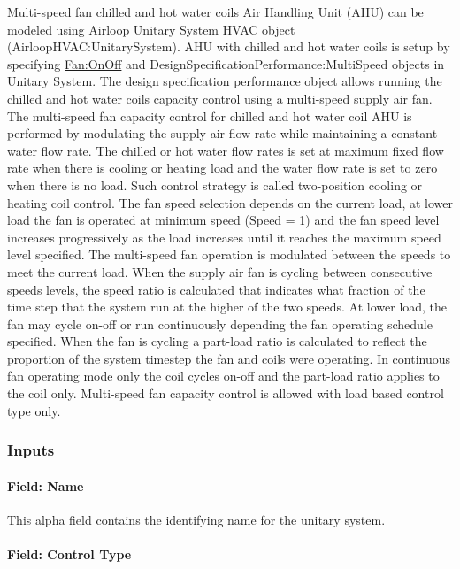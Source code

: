 Multi-speed fan chilled and hot water coils Air Handling Unit (AHU) can be modeled using Airloop Unitary System HVAC object (AirloopHVAC:UnitarySystem). AHU with chilled and hot water coils is setup by specifying \hyperref[fanonoff]{Fan:OnOff} and DesignSpecificationPerformance:MultiSpeed objects in Unitary System. The design specification performance object allows running the chilled and hot water coils capacity control using a multi-speed supply air fan. The multi-speed fan capacity control for chilled and hot water coil AHU is performed by modulating the supply air flow rate while maintaining a constant water flow rate. The chilled or hot water flow rates is set at maximum fixed flow rate when there is cooling or heating load and the water flow rate is set to zero when there is no load. Such control strategy is called two-position cooling or heating coil control. The fan speed selection depends on the current load, at lower load the fan is operated at minimum speed (Speed = 1) and the fan speed level increases progressively as the load increases until it reaches the maximum speed level specified. The multi-speed fan operation is modulated between the speeds to meet the current load. When the supply air fan is cycling between consecutive speeds levels, the speed ratio is calculated that indicates what fraction of the time step that the system run at the higher of the two speeds. At lower load, the fan may cycle on-off or run continuously depending the fan operating schedule specified. When the fan is cycling a part-load ratio is calculated to reflect the proportion of the system timestep the fan and coils were operating. In continuous fan operating mode only the coil cycles on-off and the part-load ratio applies to the coil only. Multi-speed fan capacity control is allowed with load based control type only.

\subsubsection{Inputs}\label{inputs-049}

\paragraph{Field: Name}\label{field-name-048}

This alpha field contains the identifying name for the unitary system.

\paragraph{Field: Control Type}\label{field-control-type-004}

